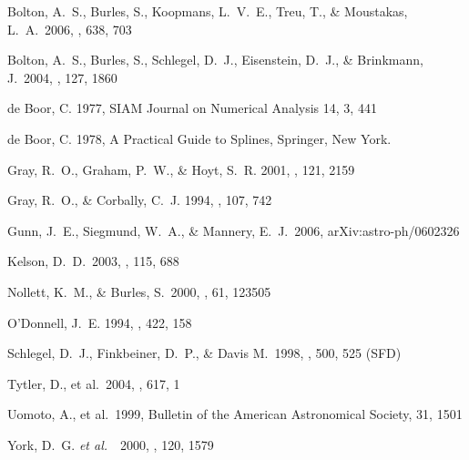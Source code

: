 \documentclass[12pt,preprint]{aastex}
\newcommand{\etal}{{\it et al.}~}
\begin{document}
\begin{thebibliography}{DUM}

 Bolton, A.~S., Burles, 
S., Koopmans, L.~V.~E., Treu, T., \& Moustakas, L.~A.\ 2006, \apj, 638, 703 

 Bolton, A.~S., Burles, 
S., Schlegel, D.~J., Eisenstein, D.~J., \& Brinkmann, J.\ 2004, \aj, 127, 
1860 

de Boor, C. 1977,  SIAM Journal on Numerical Analysis 14, 3, 441

de Boor, C. 1978, A Practical Guide to Splines, Springer, New York.

Gray, R.\ O., Graham, P.\ W., \& Hoyt, S.\ R. 2001, \aj, 121, 2159

Gray, R.\ O., \& Corbally, C.\ J. 1994, \aj, 107, 742

 Gunn, J.~E., Siegmund, 
W.~A., \& Mannery, E.~J.\ 2006, arXiv:astro-ph/0602326 

 Kelson, D.~D.\ 2003, \pasp, 
115, 688 

 Nollett, K.~M., \& 
Burles, S.\ 2000, \prd, 61, 123505 
 
O'Donnell, J.\ E. 1994, \apj, 422, 158

Schlegel, D.\ J., Finkbeiner, D.\ P., \& Davis M.\ 1998, \apj, 500, 525 (SFD)

 Tytler, D., et al.\ 
2004, \apj, 617, 1 

 Uomoto, A., et al.\ 
1999, Bulletin of the American Astronomical Society, 31, 1501 
 
\bibitem[York et al. 2000]{york00}
York, D.\ G. \etal\ 2000, \aj, 120, 1579

\end{thebibliography}
\clearpage

\appendix
\end{document}
